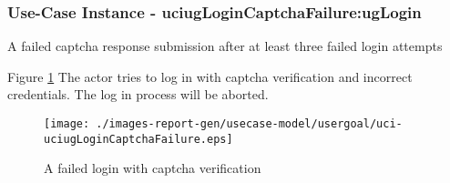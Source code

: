 
	\subsubsection{Use-Case Instance - uciugLoginCaptchaFailure:ugLogin}
	
	A failed captcha response submission after at least three failed login attempts		  
	\begin{operationmodel}
	
	\end{operationmodel} 

	
	Figure \ref{fig:lu.uni.lassy.excalibur.examples.icrash-RE-UC-uci-uciugLoginCaptchaFailure}
	The actor tries to log in with captcha verification and incorrect credentials. The log in process will be aborted.
	
	\begin{figure}[htbp]
	\begin{center}
	
	\texttt{[image: ./images-report-gen/usecase-model/usergoal/uci-uciugLoginCaptchaFailure.eps]}
	\end{center}
	\caption[lu.uni.lassy.excalibur.examples.icrash Sequence Diagram: uci-uciugLoginCaptchaFailure]{A failed login with captcha verification}
	\label{fig:lu.uni.lassy.excalibur.examples.icrash-RE-UC-uci-uciugLoginCaptchaFailure}
	\end{figure}
	\vspace{0.5cm}
